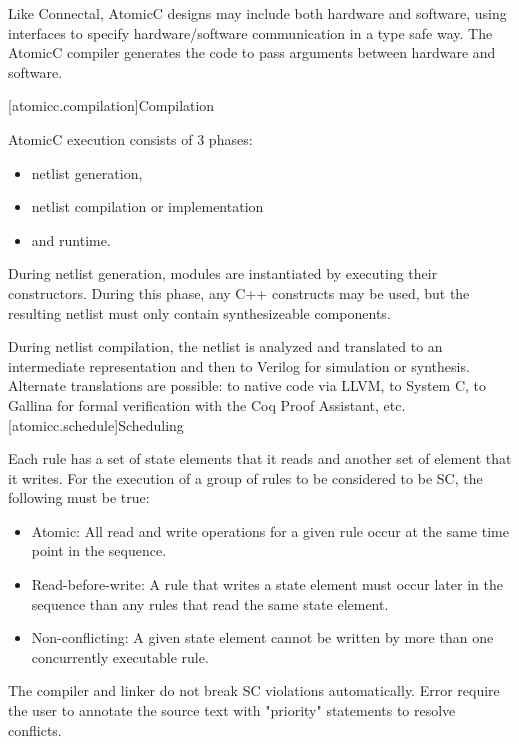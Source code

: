 Like Connectal, AtomicC designs may include both hardware and
software, using interfaces to specify hardware/software communication
in a type safe way. The AtomicC compiler generates the code to pass
arguments between hardware and software.

[atomicc.compilation]{Compilation}

AtomicC execution consists of 3 phases:
\begin{itemize}
\item netlist generation, 
\item netlist compilation or implementation
\item and runtime.
\end{itemize}

During netlist
generation, modules are instantiated by executing their
constructors. During this phase, any C++ constructs may be used, but
the resulting netlist must only contain synthesizeable components.

During netlist compilation, the netlist is analyzed and translated to
an intermediate representation and then to Verilog for simulation or
synthesis. Alternate translations are possible: to native code via
LLVM, to System C, to Gallina for formal verification with the Coq
Proof Assistant, etc.
\newpage
{}[atomicc.schedule]{Scheduling}

Each rule has a set of state elements that it reads and another set of element that it writes.
For the execution of a group of rules to be considered to be SC, the following must
be true:

\begin{itemize}
\item Atomic: All read and write operations for a given rule occur at the same time point in the sequence.
\item Read-before-write:  A rule that writes a state element must occur later in the sequence
than any rules that read the same state element.
\item Non-conflicting: A given state element cannot be written by more than one concurrently executable rule.
\end{itemize}

The compiler and linker do not break SC violations automatically. Error require the user to annotate
the source text with "priority" statements to resolve conflicts.

